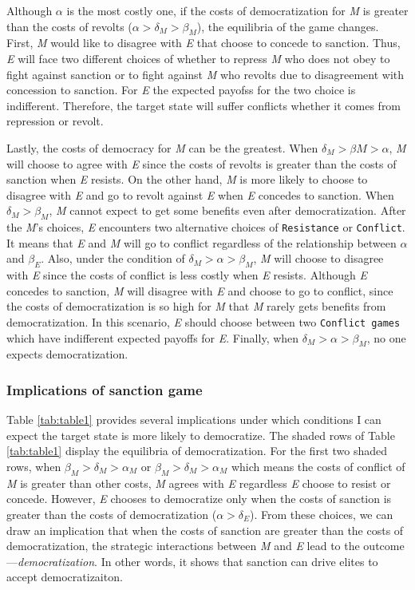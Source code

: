\documentclass[11pt]{article}
\begin{document}
Although $\alpha$ is the most costly one, if the costs of democratization for \textit{M} is greater than the costs of revolts ($\alpha > \delta_{M} > \beta_{M}$), the equilibria of the game changes. First, \textit{M} would like to disagree with \textit{E} that choose to concede to sanction. Thus, \textit{E} will face two different choices of whether to repress \textit{M} who does not obey to fight against sanction or to fight against \textit{M} who revolts due to disagreement with concession to sanction. For \textit{E} the expected payofss for the two choice is indifferent. Therefore, the target state will suffer conflicts whether it comes from repression or revolt.

Lastly, the costs of democracy for \textit{M} can be the greatest. When $\delta_{M} > \beta{M} > \alpha$, \textit{M} will choose to agree with \textit{E} since the costs of revolts is greater than the costs of sanction when \textit{E} resists. On the other hand, \textit{M} is more likely to choose to disagree with \textit{E} and go to revolt against \textit{E} when \textit{E} concedes to sanction. When $\delta_{M} > \beta_{M}$, \textit{M} cannot expect to get some benefits even after democratization. After the \textit{M}'s choices, \textit{E} encounters two alternative choices of \texttt{Resistance} or \texttt{Conflict}. It means that \textit{E} and \textit{M} will go to conflict regardless of the relationship between $\alpha$ and $\beta_{E}$. Also, under the condition of $\delta_{M} > \alpha > \beta_{M}$, \textit{M} will choose to disagree with \textit{E} since the costs of conflict is less costly when \textit{E} resists. Although \textit{E} concedes to sanction, \textit{M} will disagree with \textit{E} and choose to go to conflict, since the costs of democratization is so high for \textit{M} that \textit{M} rarely gets benefits from democratization. In this scenario, \textit{E} should choose between two \texttt{Conflict games} which have indifferent expected payoffs for \textit{E}. Finally, when $\delta_{M} > \alpha > \beta_{M}$, no one expects democratization.

	
\subsubsection*{Implications of sanction game}

Table \ref{tab:table1} provides several implications under which conditions I can expect the target state is more likely to democratize. The shaded rows of Table \ref{tab:table1} display the equilibria of democratization. For the first two shaded rows, when $\beta_{M} > \delta_{M} > \alpha_{M}$ or $\beta_{M} > \delta_{M} > \alpha_{M}$ which means the costs of conflict of \textit{M} is greater than other costs, \textit{M} agrees with \textit{E} regardless \textit{E} choose to resist or concede. However, \textit{E} chooses to democratize only when the costs of sanction is greater than the costs of democratization ($\alpha > \delta_{E}$). From these choices, we can draw an implication that when the costs of sanction are greater than the costs of democratization, the strategic interactions between \textit{M} and \textit{E} lead to the outcome---\textit{democratization}. In other words, it shows that sanction can drive elites to accept democratizaiton.
\end{document}
